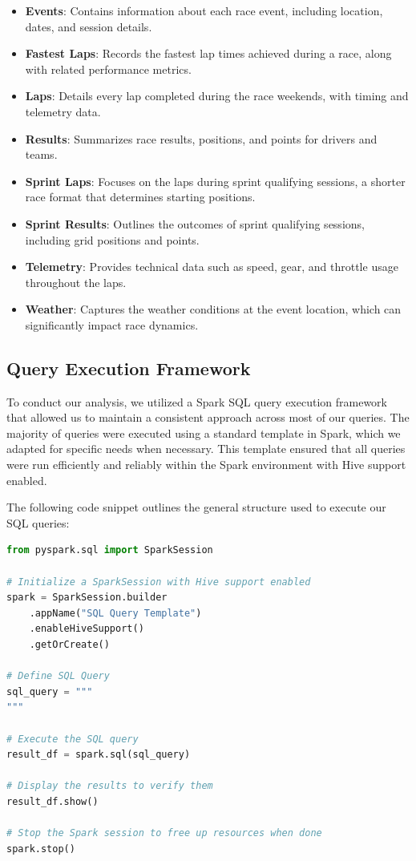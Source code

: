 \documentclass{article}
\begin{document}
\begin{itemize}
    \item \textbf{Events}: Contains information about each race event, including location, dates, and session details.
    \item \textbf{Fastest Laps}: Records the fastest lap times achieved during a race, along with related performance metrics.
    \item \textbf{Laps}: Details every lap completed during the race weekends, with timing and telemetry data.
    \item \textbf{Results}: Summarizes race results, positions, and points for drivers and teams.
    \item \textbf{Sprint Laps}: Focuses on the laps during sprint qualifying sessions, a shorter race format that determines starting positions.
    \item \textbf{Sprint Results}: Outlines the outcomes of sprint qualifying sessions, including grid positions and points.
    \item \textbf{Telemetry}: Provides technical data such as speed, gear, and throttle usage throughout the laps.
    \item \textbf{Weather}: Captures the weather conditions at the event location, which can significantly impact race dynamics.
\end{itemize}

\subsection{Query Execution Framework}

To conduct our analysis, we utilized a Spark SQL query execution framework that allowed us to maintain a consistent approach across most of our queries. The majority of queries were executed using a standard template in Spark, which we adapted for specific needs when necessary. This template ensured that all queries were run efficiently and reliably within the Spark environment with Hive support enabled.

The following code snippet outlines the general structure used to execute our SQL queries:

\begin{lstlisting}[language=Python]
from pyspark.sql import SparkSession

# Initialize a SparkSession with Hive support enabled
spark = SparkSession.builder
    .appName("SQL Query Template")
    .enableHiveSupport()
    .getOrCreate()

# Define SQL Query
sql_query = """
"""

# Execute the SQL query
result_df = spark.sql(sql_query)

# Display the results to verify them
result_df.show()

# Stop the Spark session to free up resources when done
spark.stop()
\end{lstlisting}
\end{document}
